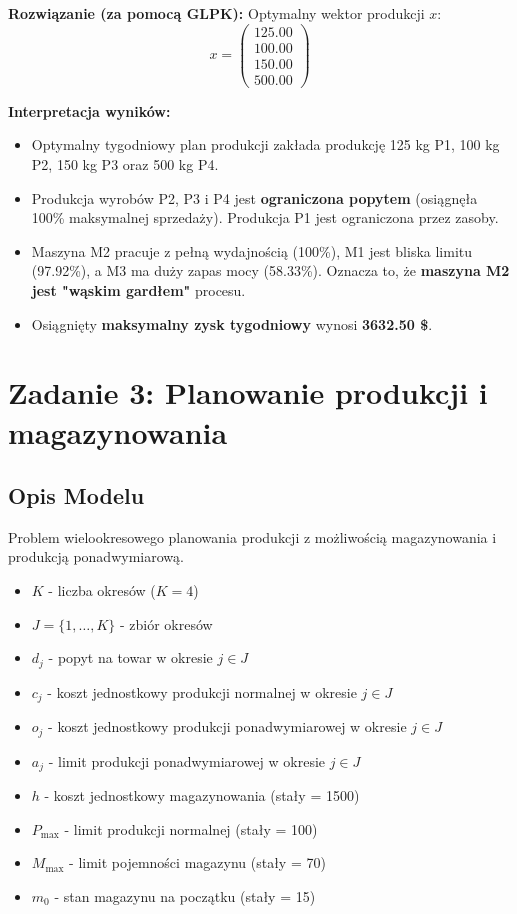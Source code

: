 \documentclass[11pt, a4paper]{article}
\begin{document}
\bigskip
\noindent \textbf{Rozwiązanie (za pomocą GLPK):}
Optymalny wektor produkcji $x$:
$$ x =
\begin{pmatrix}
125.00 \\
100.00 \\
150.00 \\
500.00
\end{pmatrix}
$$

\noindent \textbf{Interpretacja wyników:}
\begin{itemize}
    \item Optymalny tygodniowy plan produkcji zakłada produkcję 125 kg P1, 100 kg P2, 150 kg P3 oraz 500 kg P4.
    \item Produkcja wyrobów P2, P3 i P4 jest \textbf{ograniczona popytem} (osiągnęła 100\% maksymalnej sprzedaży). Produkcja P1 jest ograniczona przez zasoby.
    \item Maszyna M2 pracuje z pełną wydajnością (100\%), M1 jest bliska limitu (97.92\%), a M3 ma duży zapas mocy (58.33\%). Oznacza to, że \textbf{maszyna M2 jest "wąskim gardłem"} procesu.
    \item Osiągnięty \textbf{maksymalny zysk tygodniowy} wynosi \textbf{3632.50 \$}.
\end{itemize}


\section{Zadanie 3: Planowanie produkcji i magazynowania}

\subsection{Opis Modelu}
Problem wielookresowego planowania produkcji z możliwością magazynowania i produkcją ponadwymiarową.

\begin{itemize}
    \item $K$ - liczba okresów ($K=4$)
    \item $J = \{1, \dots, K\}$ - zbiór okresów
    \item $d_j$ - popyt na towar w okresie $j \in J$
    \item $c_j$ - koszt jednostkowy produkcji normalnej w okresie $j \in J$
    \item $o_j$ - koszt jednostkowy produkcji ponadwymiarowej w okresie $j \in J$
    \item $a_j$ - limit produkcji ponadwymiarowej w okresie $j \in J$
    \item $h$ - koszt jednostkowy magazynowania (stały = 1500)
    \item $P_{\max}$ - limit produkcji normalnej (stały = 100)
    \item $M_{\max}$ - limit pojemności magazynu (stały = 70)
    \item $m_0$ - stan magazynu na początku (stały = 15)
\end{itemize}
\end{document}
